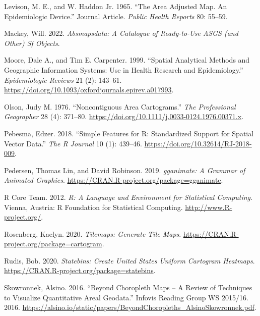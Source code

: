 \begin{CSLReferences}{1}{0}
\leavevmode{}%
Levison, M. E., and W. Haddon Jr. 1965. {``{The Area Adjusted Map. An Epidemiologic Device}.''} Journal Article. \emph{Public Health Reports} 80: 55--59.

\leavevmode{}%
Mackey, Will. 2022. \emph{Absmapsdata: A Catalogue of Ready-to-Use ASGS (and Other) Sf Objects}.

\leavevmode{}%
Moore, Dale A., and Tim E. Carpenter. 1999. {``{Spatial Analytical Methods and Geographic Information Systems: Use in Health Research and Epidemiology}.''} \emph{Epidemiologic Reviews} 21 (2): 143--61. \url{https://doi.org/10.1093/oxfordjournals.epirev.a017993}.

\leavevmode{}%
Olson, Judy M. 1976. {``{Noncontiguous Area Cartograms}.''} \emph{The Professional Geographer} 28 (4): 371--80. \url{https://doi.org/10.1111/j.0033-0124.1976.00371.x}.

\leavevmode{}%
Pebesma, Edzer. 2018. {``{Simple Features for R: Standardized Support for Spatial Vector Data}.''} \emph{{The R Journal}} 10 (1): 439--46. \url{https://doi.org/10.32614/RJ-2018-009}.

\leavevmode{}%
Pedersen, Thomas Lin, and David Robinson. 2019. \emph{{gganimate: A Grammar of Animated Graphics}}. \url{https://CRAN.R-project.org/package=gganimate}.

\leavevmode{}%
R Core Team. 2012. \emph{R: A Language and Environment for Statistical Computing}. Vienna, Austria: R Foundation for Statistical Computing. \url{http://www.R-project.org/}.

\leavevmode{}%
Rosenberg, Kaelyn. 2020. \emph{Tilemaps: Generate Tile Maps}. \url{https://CRAN.R-project.org/package=cartogram}.

\leavevmode{}%
Rudis, Bob. 2020. \emph{Statebins: Create United States Uniform Cartogram Heatmaps}. \url{https://CRAN.R-project.org/package=statebins}.

\leavevmode{}%
Skowronnek, Alsino. 2016. {``{Beyond Choropleth Maps -- A Review of Techniques to Visualize Quantitative Areal Geodata}.''} {Infovis Reading Group WS 2015/16}. 2016. \url{https://alsino.io/static/papers/BeyondChoropleths_AlsinoSkowronnek.pdf}.


\end{CSLReferences}
